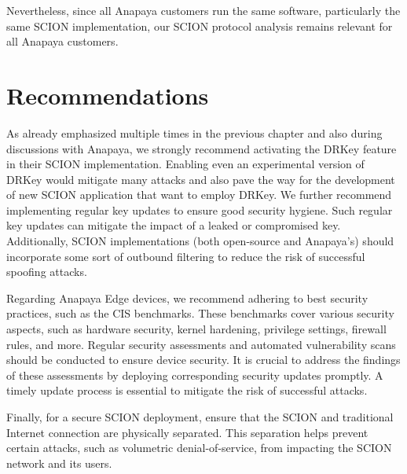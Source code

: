 Nevertheless, since all Anapaya customers run the same software, particularly the same SCION implementation, our SCION protocol analysis remains relevant for all Anapaya customers.


\section{Recommendations}

As already emphasized multiple times in the previous chapter and also during discussions with Anapaya, we strongly recommend activating the DRKey feature in their SCION implementation.
Enabling even an experimental version of DRKey would mitigate many attacks and also pave the way for the development of new SCION application that want to employ DRKey.
We further recommend implementing regular key updates to ensure good security hygiene.
Such regular key updates can mitigate the impact of a leaked or compromised key.
Additionally, SCION implementations (both open-source and Anapaya's) should incorporate some sort of outbound filtering to reduce the risk of successful spoofing attacks.

Regarding Anapaya Edge devices, we recommend adhering to best security practices, such as the CIS benchmarks.
These benchmarks cover various security aspects, such as hardware security, kernel hardening, privilege settings, firewall rules, and more.
Regular security assessments and automated vulnerability scans should be conducted to ensure device security.
It is crucial to address the findings of these assessments by deploying corresponding security updates promptly.
A timely update process is essential to mitigate the risk of successful attacks.

Finally, for a secure SCION deployment, ensure that the SCION and traditional Internet connection are physically separated.
This separation helps prevent certain attacks, such as volumetric denial-of-service, from impacting the SCION network and its users.

